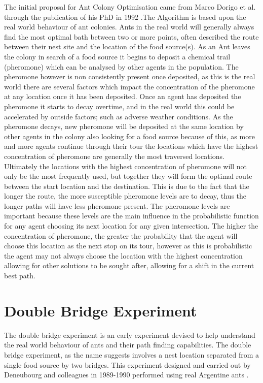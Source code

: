 The initial proposal for Ant Colony Optimisation came from Marco Dorigo et al. through the publication of his PhD in 1992 \cite{Dor1992:thesis}.The Algorithm is based upon the real world behaviour of ant colonies. Ants in the real world will generally always find the most optimal bath between two or more points, often described the route between their nest site and the location of the food source(s). As an Ant leaves the colony in search of a food source it begins to deposit a chemical trail (pheromone) which can be analysed by other agents in the population. The pheromone however is non consistently present once deposited, as this is the real world there are several factors which impact the concentration of the pheromone at any location once it has been deposited. Once an agent has deposited the pheromone it starts to decay overtime, and in the real world this could be accelerated by outside factors; such as adverse weather conditions. As the pheromone decays, new pheromone will be deposited at the same location by other agents in the colony also looking for a food source because of this, as more and more agents continue through their tour the locations which have the highest concentration of pheromone are generally the most traversed locations. Ultimately the locations with the highest concentration of pheromone will not only be the most frequently used, but together they will form the optimal route between the start location and the destination. This is due to the fact that the longer the route, the more susceptible pheromone levels are to decay, thus the longer paths will have less pheromone present. The pheromone levels are important because these levels are the main influence in the probabilistic function for any agent choosing its next location for any given intersection. The higher the concentration of pheromone, the greater the probability that the agent will choose this location as the next stop on its tour, however as this is probabilistic the agent may not always choose the location with the highest concentration allowing for other solutions to be sought after, allowing for a shift in the current best path.

\section{Double Bridge Experiment}
\label{dblbridge}
The double bridge experiment is an early experiment devised to help understand the real world behaviour of ants and their path finding capabilities. The double bridge experiment, as the name suggests involves a nest location separated from a single food source by two bridges. This experiment designed and carried out by Deneubourg and colleagues in 1989-1990 performed using real Argentine ants \cite{marcdorgio:book:doublebridges}.

